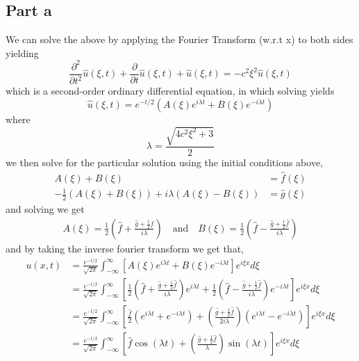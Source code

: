 \documentclass[12pt]{report}
\begin{document}
\subsection*{Part a}
We can solve the above by applying the Fourier Transform (w.r.t x) to both sides yielding
\begin{equation*}
    \frac{\partial^2}{\partial t^2} \hat{u}(\xi,t) + \frac{\partial }{\partial t} \hat{u}(\xi,t) + \hat{u}(\xi,t) = -c^2\xi^2 \hat{u}(\xi,t)
\end{equation*}
which is a second-order ordinary differential equation, in which solving yields
\begin{equation*}
    \hat{u}(\xi,t) = e^{-t/2}\left(A(\xi) e^{i\lambda t} + B(\xi) e^{-i\lambda t}\right)
\end{equation*}
where 
\begin{equation*}
    \lambda = \frac{\sqrt{4c^2\xi^2 + 3}}{2}
\end{equation*}
we then solve for the particular solution using the initial conditions above,
\begin{align*}
    A(\xi) + B(\xi) &= \hat{f}(\xi) \\
    -\frac{1}{2}(A(\xi) + B(\xi)) + i\lambda (A(\xi) - B(\xi)) &= \hat{g}(\xi)
\end{align*} 
and solving we get
\begin{align*}
    A(\xi) = \frac{1}{2}\left(\hat{f} + \frac{\hat{g} + \frac{1}{2}\hat{f}}{i\lambda}\right) \quad \text{and} \quad B(\xi) = \frac{1}{2}\left(\hat{f} - \frac{\hat{g} + \frac{1}{2}\hat{f}}{i\lambda}\right)
\end{align*}
and by taking the inverse fourier transform we get that,
\begin{align*}
    u(x,t) &= \frac{e^{-t/2}}{\sqrt{2\pi}} \int_{-\infty}^\infty \left[A(\xi)e^{i\lambda t} + B(\xi)e^{-i\lambda t}\right] e^{i\xi x} d\xi \\
    &= \frac{e^{-t/2}}{\sqrt{2\pi}} \int_{-\infty}^\infty \left[\frac{1}{2}\left(\hat{f} + \frac{\hat{g} + \frac{1}{2}\hat{f}}{i\lambda}\right)e^{i\lambda t} + \frac{1}{2}\left(\hat{f} - \frac{\hat{g} + \frac{1}{2}\hat{f}}{i\lambda}\right)e^{-i\lambda t}\right]e^{i\xi x} d\xi \\
    &= \frac{e^{-t/2}}{\sqrt{2\pi}} \int_{-\infty}^\infty \left[\frac{\hat{f}}{2}(e^{i\lambda t} + e^{-i\lambda t}) + \left( \frac{\hat{g} + \frac{1}{2}\hat{f}}{2i\lambda}\right)(e^{i\lambda t} - e^{-i\lambda t})\right]e^{i\xi x} d\xi \\
    &= \frac{e^{-t/2}}{\sqrt{2\pi}} \int_{-\infty}^\infty \left[\hat{f}\cos(\lambda t) + \left( \frac{\hat{g} + \frac{1}{2}\hat{f}}{\lambda}\right)\sin(\lambda t)\right]e^{i\xi x} d\xi 
\end{align*} 
\end{document}

